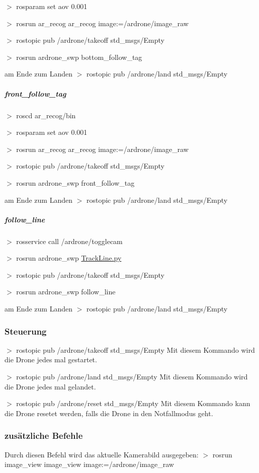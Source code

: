 $>$ rosparam set aov 0.001

$>$ rosrun ar\_\-recog ar\_\-recog image:=/ardrone/image\_\-raw

$>$ rostopic pub /ardrone/takeoff std\_\-msgs/Empty

$>$ rosrun ardrone\_\-swp bottom\_\-follow\_\-tag

am Ende zum Landen $>$ rostopic pub /ardrone/land std\_\-msgs/Empty

\subparagraph*{front\_\-follow\_\-tag }

$>$ roscd ar\_\-recog/bin

$>$ rosparam set aov 0.001

$>$ rosrun ar\_\-recog ar\_\-recog image:=/ardrone/image\_\-raw

$>$ rostopic pub /ardrone/takeoff std\_\-msgs/Empty

$>$ rosrun ardrone\_\-swp front\_\-follow\_\-tag

am Ende zum Landen $>$ rostopic pub /ardrone/land std\_\-msgs/Empty

\subparagraph*{follow\_\-line }

$>$ rosservice call /ardrone/togglecam

$>$ rosrun ardrone\_\-swp \hyperlink{_track_line_8py}{TrackLine.py}

$>$ rostopic pub /ardrone/takeoff std\_\-msgs/Empty

$>$ rosrun ardrone\_\-swp follow\_\-line

am Ende zum Landen $>$ rostopic pub /ardrone/land std\_\-msgs/Empty

\subsubsection*{Steuerung }

$>$ rostopic pub /ardrone/takeoff std\_\-msgs/Empty Mit diesem Kommando wird die Drone jedes mal gestartet.

$>$ rostopic pub /ardrone/land std\_\-msgs/Empty Mit diesem Kommando wird die Drone jedes mal gelandet.

$>$ rostopic pub /ardrone/reset std\_\-msgs/Empty Mit diesem Kommando kann die Drone resetet werden, falls die Drone in den Notfallmodus geht.

\subsubsection*{zusätzliche Befehle }

Durch diesen Befehl wird das aktuelle Kamerabild ausgegeben: $>$ rosrun image\_\-view image\_\-view image:=/ardrone/image\_\-raw

